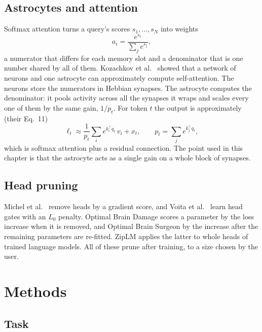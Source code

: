 \documentclass[11pt]{report}
\begin{document}
\subsection{Astrocytes and attention}

Softmax attention turns a query's scores $s_1, \dots, s_N$ into weights
\begin{equation}
a_i = \frac{e^{s_i}}{\sum_j e^{s_j}} ,
\end{equation}
a numerator that differs for each memory slot and a denominator that is one number shared by
all of them. Kozachkov et al.\ \cite{kozachkov2023} showed that a network of neurons and one
astrocyte can approximately compute self-attention. The neurons store the numerators in Hebbian
synapses. The astrocyte computes the denominator: it pools activity across all the synapses it
wraps and scales every one of them by the same gain, $1/p_t$. For token $t$ the output is
approximately (their Eq.~11)
\begin{equation}
\ell_t \approx \frac{1}{p_t} \sum_i e^{k_i^{\top} q_t}\, v_i + x_t,
\qquad p_t = \sum_j e^{k_j^{\top} q_t},
\end{equation}
which is softmax attention plus a residual connection. The point used in this chapter is that
the astrocyte acts as a single gain on a whole block of synapses.

\subsection{Head pruning}

Michel et al.\ \cite{michel2019sixteen} remove heads by a gradient score, and Voita et al.\
\cite{voita2019analyzing} learn head gates with an $L_0$ penalty. Optimal Brain Damage \cite{obd}
scores a parameter by the loss increase when it is removed, and Optimal Brain Surgeon \cite{obs} by
the increase after the remaining parameters are re-fitted. ZipLM \cite{ziplm} applies the latter to
whole heads of trained language models. All of these prune after training, to a size chosen by
the user.

\section{Methods}

\subsection{Task}
\end{document}
